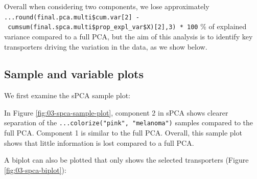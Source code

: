 \documentclass[
]{book}
\newenvironment{Shaded}{\begin{snugshade}}{\end{snugshade}}
\newcommand{\AttributeTok}[1]{\textcolor[rgb]{0.77,0.63,0.00}{#1}}
\newcommand{\CommentTok}[1]{\textcolor[rgb]{0.56,0.35,0.01}{\textit{#1}}}
\newcommand{\ConstantTok}[1]{\textcolor[rgb]{0.00,0.00,0.00}{#1}}
\newcommand{\DecValTok}[1]{\textcolor[rgb]{0.00,0.00,0.81}{#1}}
\newcommand{\FunctionTok}[1]{\textcolor[rgb]{0.00,0.00,0.00}{#1}}
\newcommand{\NormalTok}[1]{#1}
\newcommand{\SpecialCharTok}[1]{\textcolor[rgb]{0.00,0.00,0.00}{#1}}
\newcommand{\StringTok}[1]{\textcolor[rgb]{0.31,0.60,0.02}{#1}}
\begin{document}
Overall when considering two components, we lose approximately \texttt{...round(final.pca.multi\$cum.var{[}2{]}\ -\ cumsum(final.spca.multi\$prop\_expl\_var\$X){[}2{]},3)\ *\ 100} \% of explained variance compared to a full PCA, but the aim of this analysis is to identify key transporters driving the variation in the data, as we show below.

\hypertarget{03:spca-plots}{%
\subsection{Sample and variable plots}\label{03:spca-plots}}

We first examine the sPCA sample plot:

\begin{Shaded}
\end{Shaded}



In Figure \ref{fig:03-spca-sample-plot}, component 2 in sPCA shows clearer separation of the \texttt{...colorize("pink",\ "melanoma")} samples compared to the full PCA. Component 1 is similar to the full PCA. Overall, this sample plot shows that little information is lost compared to a full PCA.

A biplot can also be plotted that only shows the selected transporters (Figure \ref{fig:03-spca-biplot}):

\begin{Shaded}
\end{Shaded}
\end{document}
